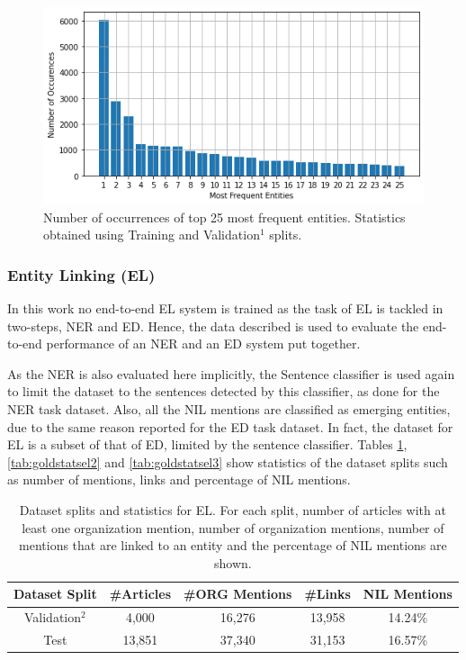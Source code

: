 \documentclass{report}
\theoremstyle{definition}
\theoremstyle{remark}
\begin{document}
\begin{figure}
    \centering
    \includegraphics[scale=0.6]{ent_occ.png}
    \caption{Number of occurrences of top 25 most frequent entities. Statistics obtained using Training and Validation$^1$ splits.}
    \label{fig:entpopul}
\end{figure}


\subsubsection{Entity Linking (EL)}
In this work no end-to-end EL system is trained as the task of EL is tackled in two-steps, NER and ED. Hence, the data described is used to evaluate the end-to-end performance of an NER and an ED system put together. 

As the NER is also evaluated here implicitly, the Sentence classifier is used again to limit the dataset to the sentences detected by this classifier, as done for the NER task dataset. Also, all the NIL mentions are classified as emerging entities, due to the same reason reported for the ED task dataset. In fact, the dataset for EL is a subset of that of ED, limited by the sentence classifier. Tables \ref{tab:goldstatsel}, \ref{tab:goldstatsel2} and \ref{tab:goldstatsel3} show statistics of the dataset splits such as number of mentions, links and percentage of NIL mentions.

\begin{table}[H]
    \centering
    \begin{tabular}{ccccc}
     Dataset Split & \#Articles & \#ORG Mentions & \#Links & NIL Mentions  \\
     \hline
    Validation$^2$ & 4,000  & 16,276 & 13,958 & 14.24\% \\
    Test           & 13,851 & 37,340 & 31,153 & 16.57\% \\
    \end{tabular}
    \caption{Dataset splits and statistics for EL. For each split, number of articles with at least one organization mention, number of organization mentions, number of mentions that are linked to an entity and the percentage of NIL mentions are shown.}
    \label{tab:goldstatsel}
\end{table}
\end{document}
